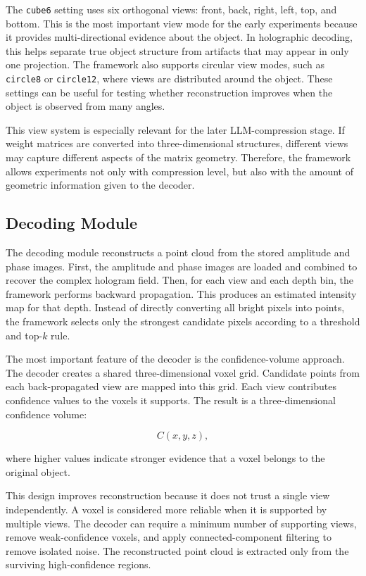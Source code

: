 \documentclass{article}
\begin{document}
\begin{normalsize}
The \texttt{cube6} setting uses six orthogonal views: front, back, right, left, top, and bottom. This is the most important view mode for the early experiments because it provides multi-directional evidence about the object. In holographic decoding, this helps separate true object structure from artifacts that may appear in only one projection. The framework also supports circular view modes, such as \texttt{circle8} or \texttt{circle12}, where views are distributed around the object. These settings can be useful for testing whether reconstruction improves when the object is observed from many angles.

This view system is especially relevant for the later LLM-compression stage. If weight matrices are converted into three-dimensional structures, different views may capture different aspects of the matrix geometry. Therefore, the framework allows experiments not only with compression level, but also with the amount of geometric information given to the decoder.

\subsection{Decoding Module}

The decoding module reconstructs a point cloud from the stored amplitude and phase images. First, the amplitude and phase images are loaded and combined to recover the complex hologram field. Then, for each view and each depth bin, the framework performs backward propagation. This produces an estimated intensity map for that depth. Instead of directly converting all bright pixels into points, the framework selects only the strongest candidate pixels according to a threshold and top-\(k\) rule.

The most important feature of the decoder is the confidence-volume approach. The decoder creates a shared three-dimensional voxel grid. Candidate points from each back-propagated view are mapped into this grid. Each view contributes confidence values to the voxels it supports. The result is a three-dimensional confidence volume:

\[
C(x,y,z),
\]

where higher values indicate stronger evidence that a voxel belongs to the original object.

This design improves reconstruction because it does not trust a single view independently. A voxel is considered more reliable when it is supported by multiple views. The decoder can require a minimum number of supporting views, remove weak-confidence voxels, and apply connected-component filtering to remove isolated noise. The reconstructed point cloud is extracted only from the surviving high-confidence regions.


\end{normalsize}
\end{document}
